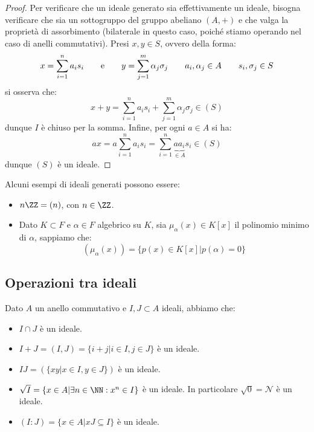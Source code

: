 \documentclass[11pt]{scrartcl}
\begin{document}
\begin{proof}
    Per verificare che un ideale generato sia effettivamente un ideale, bisogna verificare che sia un sottogruppo del gruppo abeliano $(A,+)$ e che valga la proprietà di assorbimento (bilaterale in questo caso,
    poiché stiamo operando nel caso di anelli commutativi). Presi $x,y \in S$, ovvero della forma:
        \[ x = \sum_{i = 1}^n a_is_i \qquad \text e \qquad y = \sum_{j=1}^m\alpha_j \sigma_j \qquad a_i,\alpha_j \in A \qquad s_i,\sigma_j \in S 
            \]
    si osserva che:
        \[ x + y = \sum_{i = 1}^n a_is_i + \sum_{j=1}^m\alpha_j \sigma_j \in (S)
            \]
    dunque $I$ è chiuso per la somma. Infine, per ogni $a \in A$ si ha:
        \[ ax = a\sum_{i = 1}^n a_is_i = \sum_{i = 1}^n \underbrace{aa_i}_{\in A}s_i \in (S)
            \]
    dunque $(S)$ è un ideale.
\end{proof}

\begin{example}
    Alcuni esempi di ideali generati possono essere:
    \begin{itemize}
        \item $n\ZZ = (n)$, con $n \in \ZZ$.
        \item Dato $K \subset F$ e $\alpha \in F$ algebrico su $K$, sia $\mu_{\alpha}(x) \in K[x]$ il polinomio minimo di $\alpha$, sappiamo che:
            \[ (\mu_{\alpha}(x)) = \{p(x) \in K[x] | p(\alpha) = 0\}
                \]
    \end{itemize}
\end{example}


\newpage
\subsection{Operazioni tra ideali}
\begin{proposition}
    Dato $A$ un anello commutativo e $I,J \subset A$ ideali, abbiamo che:
    \begin{itemize}
        \item $I \cap J$ è un ideale.
        \item $I + J = (I,J) = \{i + j | i \in I, j \in J\}$ è un ideale.
        \item $IJ = (\{xy|x \in I, y \in J\})$ è un ideale.
        \item $\sqrt{I} = \{x \in A | \exists n \in \NN : x^n \in I\}$ è un ideale. In particolare $\sqrt{0} = \mathcal{N}$ è un ideale.
        \item $(I : J) = \{x \in A | xJ \subseteq I\}$ è un ideale.
    \end{itemize}
\end{proposition}
\end{document}
